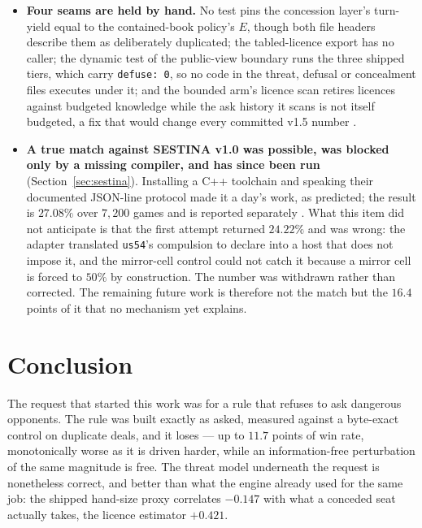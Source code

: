 \documentclass[11pt]{article}
\newcommand{\code}[1]{\texttt{#1}}
\newcommand{\usff}{\code{us54}}
\begin{document}
\begin{itemize}
  called the exported functions directly, and nothing pinned what \code{pickAsk} did with the
  numbers they returned. Two decision-level tests now close it.
\item \textbf{Four seams are held by hand.} No test pins the concession layer's turn-yield equal to
  the contained-book policy's $E$, though both file headers describe them as deliberately
  duplicated; the tabled-licence export has no caller; the dynamic test of the public-view boundary
  runs the three shipped tiers, which carry \code{defuse: 0}, so no code in the threat, defusal or
  concealment files executes under it; and the bounded arm's licence scan retires licences against
  budgeted knowledge while the ask history it scans is not itself budgeted, a fix that would change
  every committed v1.5 number \cite{v15paper,bounded}.
\item \textbf{A true match against SESTINA v1.0 was possible, was blocked only by a missing
  compiler, and has since been run} (Section~\ref{sec:sestina}). Installing a C++ toolchain and
  speaking their documented JSON-line protocol made it a day's work, as predicted; the result is
  $27.08\%$ over $7{,}200$ games and is reported separately \cite{frontierpaper,fishlabs}. What
  this item did not anticipate is that the first attempt returned $24.22\%$ and was wrong: the
  adapter translated \usff{}'s compulsion to declare into a host that does not impose it, and the
  mirror-cell control could not catch it because a mirror cell is forced to $50\%$ by
  construction. The number was withdrawn rather than corrected. The remaining future work is
  therefore not the match but the $16.4$ points of it that no mechanism yet explains.
\end{itemize}

\section{Conclusion}
\label{sec:conclusion}

The request that started this work was for a rule that refuses to ask dangerous opponents. The rule
was built exactly as asked, measured against a byte-exact control on duplicate deals, and it loses
--- up to $11.7$ points of win rate, monotonically worse as it is driven harder, while an
information-free perturbation of the same magnitude is free. The threat model underneath the request
is nonetheless correct, and better than what the engine already used for the same job: the shipped
hand-size proxy correlates $-0.147$ with what a conceded seat actually takes, the licence estimator
$+0.421$.
\end{document}
